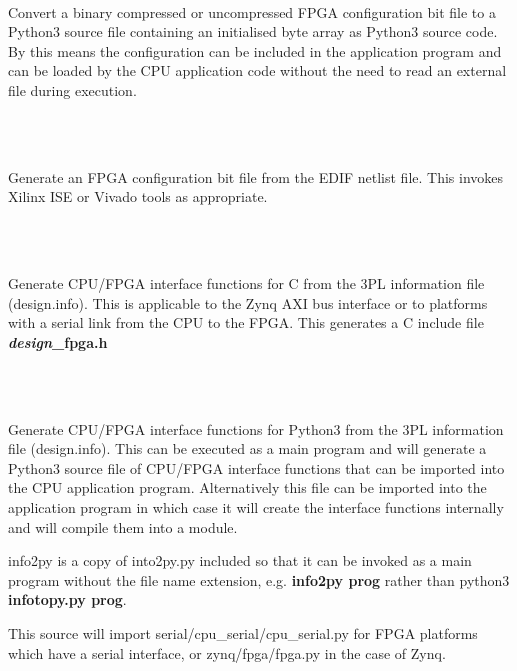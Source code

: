 \begin{tabbing}
        \>\>\\
            \>\>\>\>\parbox[t]{12cm}{Convert a binary compressed or
                uncompressed FPGA configuration bit file to a Python3 source
                file containing an initialised byte array as Python3 source
                code. By this means the configuration can be included in the
                application program and can be loaded by the CPU application
                code without the need to read an external file during
                execution.}\\

        \>\>\\
            \>\>\>\>\parbox[t]{12cm}{Generate an FPGA configuration bit file
                from the EDIF netlist file. This invokes Xilinx ISE or
                Vivado tools as appropriate.}\\
        \>\>\\
                \>\>\>\>\parbox[t]{10cm}{Generate CPU/FPGA interface
                functions for C from the 3PL information file (design.info).
                This is applicable to the Zynq AXI bus interface or to
                platforms with a serial link from the CPU to the FPGA.
                This generates a C include file {\bf {\em design}\_fpga.h}}\\

        \>\>\\
            \>\>\>\>\parbox[t]{12cm}{Generate CPU/FPGA interface functions for
                Python3 from the 3PL information file (design.info). This can
                be executed as a main program and will generate a Python3
                source file of CPU/FPGA interface functions that can be
                imported into the CPU application program. Alternatively this
                file can be imported into the application program in which
                case it will create the interface functions internally and
                will compile them into a module.
                
                info2py is a copy of into2py.py included so that it can be
                invoked as a main program without the file name extension, e.g.
                {\bf info2py prog} rather than python3 {\bf infotopy.py prog}.
                
                This source will import serial/cpu\_serial/cpu\_serial.py
                for FPGA platforms which have a serial interface, or
                zynq/fpga/fpga.py in the case of Zynq.}\\
                

\end{tabbing}
